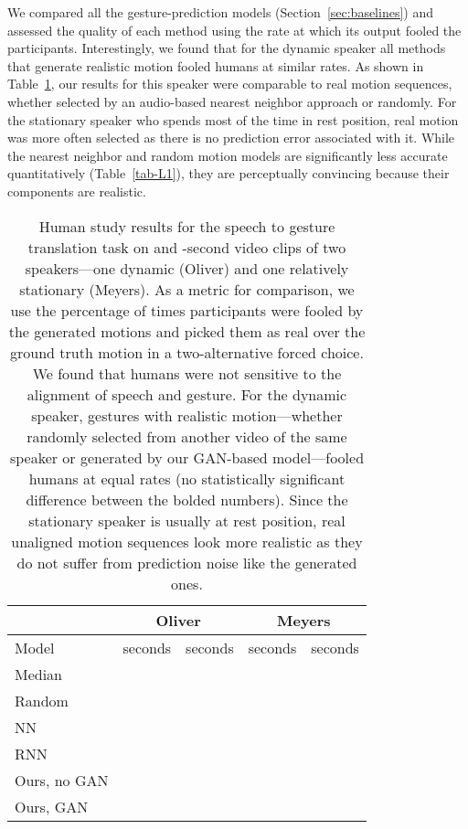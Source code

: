 \documentclass[10pt,twocolumn,letterpaper]{article}
\begin{document}
We compared all the gesture-prediction models (Section~\ref{sec:baselines}) and assessed the quality of each method using the rate at which its output fooled the participants. Interestingly, we found that for the dynamic speaker all methods that generate realistic motion fooled humans at similar rates. As shown in Table~\ref{tab-mturk}, our results for this speaker were comparable to real motion sequences, whether selected by an audio-based nearest neighbor approach or randomly. For the stationary speaker who spends most of the time in rest position, real motion was more often selected as there is no prediction error associated with it.
While the nearest neighbor and random motion models are significantly less accurate quantitatively (Table~\ref{tab-L1}), they are perceptually convincing because their components are realistic.



\begin{table}
\footnotesize
\centering
\setlength{\tabcolsep}{3pt}
\begin{tabular}{lcccc}
\toprule
 & \multicolumn{2}{c}{Oliver} & \multicolumn{2}{c}{Meyers} \tabularnewline
\midrule
Model &  seconds &  seconds &  seconds &  seconds \tabularnewline
\midrule
Median &  &   &   & \tabularnewline
\midrule
Random &   &  &   &  \tabularnewline
NN~\cite{vggish} &  &  &   &   \tabularnewline
\midrule
RNN~\cite{shlizermanaudio} &  &  &    &  \tabularnewline
\midrule
Ours, no GAN &  &  &   &  \tabularnewline
Ours, GAN &  &  &   & \tabularnewline
\bottomrule
\end{tabular}
\caption{Human study results for the speech to gesture translation task on  and -second video clips of two speakers---one dynamic (Oliver) and one relatively stationary (Meyers). As a metric for comparison, we use the percentage of times participants were fooled by the generated motions and picked them as real over the ground truth motion in a two-alternative forced choice. We found that humans were not sensitive to the alignment of speech and gesture. For the dynamic speaker, gestures with realistic motion---whether randomly selected from another video of the same speaker or generated by our GAN-based model---fooled humans at equal rates (no statistically significant difference between the bolded numbers). Since the stationary speaker is usually at rest position, real unaligned motion sequences look more realistic as they do not suffer from prediction noise like the generated ones.
}
\label{tab-mturk}
\end{table}
\end{document}
